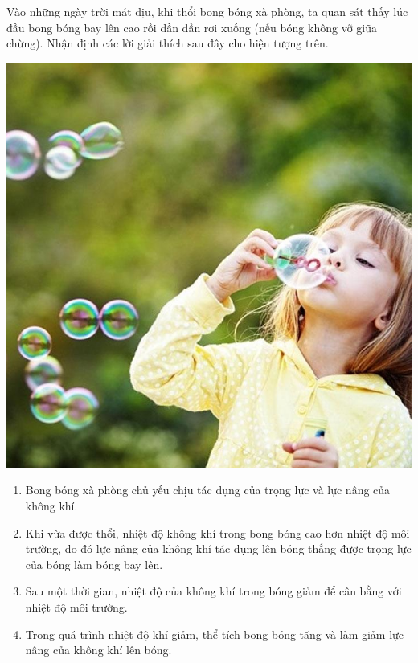 \begin{ex}
	Vào những ngày trời mát dịu, khi thổi bong bóng xà phòng, ta quan sát thấy lúc đầu bong bóng bay lên cao rồi dần dần rơi xuống (nếu bóng không vỡ giữa chừng). Nhận định các lời giải thích sau đây cho hiện tượng trên.
	\begin{center}
		\includegraphics[width=0.2\linewidth]{figs/VN12-Y24-PH-SYL-011P-1}
	\end{center}
	\begin{enumerate}[label=\alph*)]
		\item Bong bóng xà phòng chủ yếu chịu tác dụng của trọng lực và lực nâng của không khí.
		\item Khi vừa được thổi, nhiệt độ không khí trong bong bóng cao hơn nhiệt độ môi trường, do đó lực nâng của không khí tác dụng lên bóng thắng được trọng lực của bóng làm bóng bay lên.
		\item Sau một thời gian, nhiệt độ của không khí trong bóng giảm để cân bằng với nhiệt độ môi trường.
		\item Trong quá trình nhiệt độ khí giảm, thể tích bong bóng tăng và làm giảm lực nâng của không khí lên bóng.
	\end{enumerate}
	
\end{ex}
